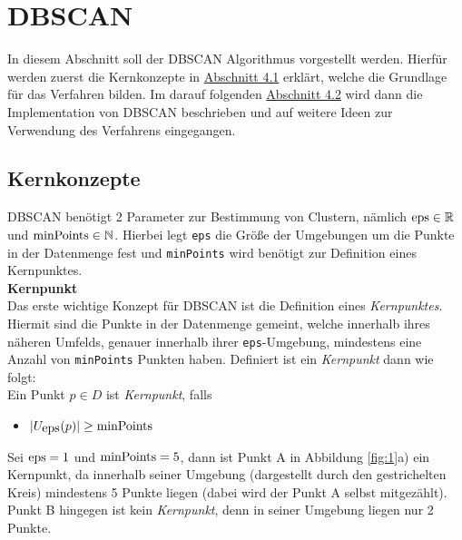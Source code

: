 \documentclass{lni}
\begin{document}
%
%

\section{DBSCAN}
In diesem Abschnitt soll der DBSCAN Algorithmus vorgestellt werden.
Hierfür werden zuerst die Kernkonzepte in \hyperref[sec:kern]{Abschnitt 4.1} erklärt, welche die Grundlage für das Verfahren bilden. Im darauf folgenden \hyperref[sec:impl]{Abschnitt 4.2} wird dann die Implementation von DBSCAN beschrieben und auf weitere Ideen zur Verwendung des Verfahrens eingegangen.

%
%

\subsection{Kernkonzepte}
\label{sec:kern}
DBSCAN benötigt 2 Parameter zur Bestimmung von Clustern, nämlich $\lstinline{eps} \in \mathbb{R}$ und $\lstinline{minPoints} \in \mathbb{N}$. Hierbei legt \lstinline{eps} die Größe der Umgebungen um die Punkte in der Datenmenge fest und \lstinline{minPoints} wird benötigt zur Definition eines Kernpunktes.\\


\textbf{Kernpunkt}\\
Das erste wichtige Konzept für DBSCAN ist die Definition eines \textit{Kernpunktes}. Hiermit sind die Punkte in der Datenmenge gemeint, welche innerhalb ihres näheren Umfelds, genauer innerhalb ihrer \lstinline{eps}-Umgebung, mindestens eine Anzahl von \lstinline{minPoints} Punkten haben. Definiert ist ein \textit{Kernpunkt} dann wie folgt:\\
Ein Punkt $ p \in D $ ist \textit{Kernpunkt}, falls
\begin{itemize}
    \item $ | U_{\lstinline{eps}}(p) | \geq \lstinline{minPoints}  $
\end{itemize}
Sei $\lstinline{eps} = 1$ und $\lstinline{minPoints} = 5$, dann ist Punkt A in Abbildung \ref{fig:1}a) ein Kernpunkt, da innerhalb seiner Umgebung (dargestellt durch den gestrichelten Kreis) mindestens 5 Punkte liegen (dabei wird der Punkt A selbst mitgezählt). Punkt B hingegen ist kein \textit{Kernpunkt}, denn in seiner Umgebung liegen nur 2 Punkte.\\

\end{document}

